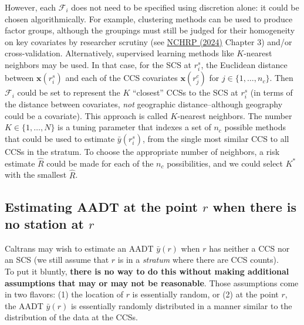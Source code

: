\documentclass[11pt]{article}
\begin{document}
However, each \(\mathcal{F}_i\) does not need to be specified using
discretion alone: it could be chosen algorithmically. For example,
clustering methods can be used to produce factor groups, although the
groupings must still be judged for their homogeneity on key covariates
by researcher scrutiny (see
\href{https://nap.nationalacademies.org/catalog/27925/guide-on-methods-for-assigning-counts-to-adjustment-factor-groups}{NCHRP
(2024)} Chapter 3) and/or cross-validation. Alternatively, supervised
learning methods like \(K\)-nearest neighbors may be used. In that case,
for the SCS at \(r_i^s\), the Euclidean distance between
\(\mathbf{x}(r_i^s)\) and each of the CCS covariates
\(\mathbf{x}(r_j^c)\) for \(j \in \{1,\ldots,n_c\}\). Then
\(\mathcal{F}_i\) could be set to represent the \(K\) ``closest'' CCSs
to the SCS at \(r_i^s\) (in terms of the distance between covariates,
\emph{not} geographic distance--although geography could be a
covariate). This approach is called \(K\)-nearest neighbors. The number
\(K \in \{1,\ldots,N\}\) is a tuning parameter that indexes a set of
\(n_c\) possible methods that could be used to estimate
\(\bar{y}(r_i^s)\), from the single most similar CCS to all CCSs in the
stratum. To choose the appropriate number of neighbors, a risk estimate
\(\hat{R}\) could be made for each of the \(n_c\) possibilities, and we
could select \(K^*\) with the smallest \(\hat{R}\).

    \subsection{\texorpdfstring{Estimating AADT at the point \(r\) when
there is no station at
\(r\)}{Estimating AADT at the point r when there is no station at r}}\label{estimating-aadt-at-the-point-r-when-there-is-no-station-at-r}

Caltrans may wish to estimate an AADT \(\bar{y}(r)\) when \(r\) has
neither a CCS nor an SCS (we still assume that \(r\) is in a
\emph{stratum} where there are CCS counts).\\
To put it bluntly, \textbf{there is no way to do this without making
additional assumptions that may or may not be reasonable}. Those
assumptions come in two flavors: (1) the location of \(r\) is
essentially random, or (2) at the point \(r\), the AADT \(\bar{y}(r)\)
is essentially randomly distributed in a manner similar to the
distribution of the data at the CCSs.
\end{document}
